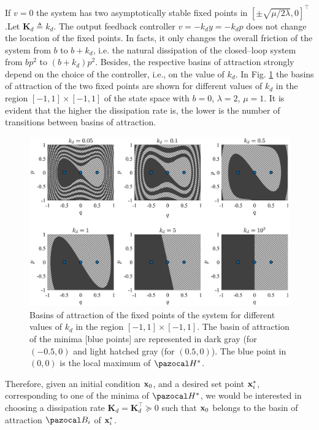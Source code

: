 If $v= 0$ the system has two asymptotically stable fixed points in $[\pm\sqrt{\mu/2\lambda},0]^\top$.Let $\mathbf{K}_d \triangleq k_d$. The output feedback controller $v = -k_d y = -k_dp$ does not change the location of the fixed points. In facts, it only changes the overall friction of the system from $b$ to $b+k_d$, i.e. the natural dissipation of the closed--loop system from $bp^2$ to $(b+k_d)p^2$.
%
Besides, the respective basins of attraction strongly depend on the choice of the controller, i.e., on the value of $k_d$. In Fig. \ref{fig:basin} the basins of attraction of the two fixed points are shown for different values of $k_d$ in the region $[-1,1]\times [-1,1]$ of the state space with $b = 0$, $\lambda = 2$, $\mu = 1$. It is evident that the higher the dissipation rate is, the lower is the number of transitions between basins of attraction.
%
\begin{figure}[!ht]
	\centering
	\includegraphics[width=\textwidth]{Figures/basin6.eps}
	\caption[Basins of attraction of the fixed points of the system for different values of $k_d$]{Basins of attraction of the fixed points of the system for different values of $k_d$ in the region $[-1,1]\times [-1,1]$. The basin of attraction of the minima [blue points] are represented in dark gray (for $(-0.5,0)$ and light hatched gray (for $(0.5,0)$). The blue point in $(0,0)$ is the local maximum of $\Ha^*$.}
	\label{fig:basin}
\end{figure}
%
\newline

%
Therefore, given an initial condition $\mathbf{x}_0$, and a desired set point $\mathbf{x}_i^*$, corresponding to one of the minima of $\Ha^*$, we would be interested in choosing a dissipation rate $\mathbf{K}_d=\mathbf{K}_d^\top\succeq 0$ such that $\mathbf{x}_0$ belongs to the basin of attraction $\B_i$ of $\mathbf{x}_i^*$. 

